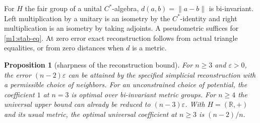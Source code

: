 \documentclass[11pt,reqno]{amsart}
\newtheorem{proposition}[theorem]{Proposition}
\theoremstyle{definition}
\theoremstyle{remark}
\numberwithin{equation}{section}
\begin{document}
For \(H\) the fair group of a unital \(C^*\)-algebra,
\(d(a,b)=\|a-b\|\) is bi-invariant. Left multiplication by a unitary
is an isometry by the \(C^*\)-identity and right multiplication is
an isometry by taking adjoints. A pseudometric suffices for
\eqref{m1:stab-eq}. At zero error exact reconstruction follows from
actual triangle equalities, or from zero distances when \(d\) is
a metric.

\begin{proposition}[sharpness of the reconstruction bound]\label{m1:sharp}
For \(n\ge3\) and \(\varepsilon>0\), the error
\((n-2)\varepsilon\) can be attained by the specified simplicial
reconstruction with a permissible choice of neighbors. For an
unconstrained choice of potential, the coefficient \(1\) at \(n=3\)
is optimal over bi-invariant metric groups. For \(n\ge4\) the
universal upper bound can already be reduced to
\((n-3)\varepsilon\). With \(H=(\mathbb R,+)\) and its usual metric,
the optimal universal coefficient at \(n\ge3\) is \((n-2)/n\).
\end{proposition}
\end{document}
